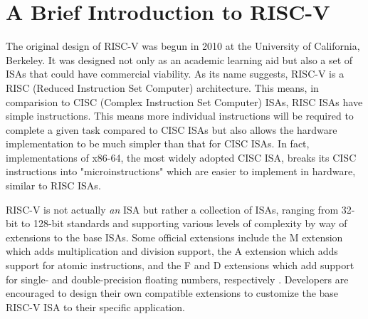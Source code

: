 \documentclass[lettersize,journal]{IEEEtran}
\begin{document}
\section{A Brief Introduction to RISC-V}
The original design of RISC-V was begun in 2010 at the University of California, Berkeley. 
It was designed not only as an academic learning aid but also a set of ISAs that could have commercial viability. 
As its name suggests, RISC-V is a RISC (Reduced Instruction Set Computer) architecture. 
This means, in comparision to CISC (Complex Instruction Set Computer) ISAs, RISC ISAs have simple instructions. 
This means more individual instructions will be required to complete a given task compared to CISC ISAs but also allows the 
hardware implementation to be much simpler than that for CISC ISAs. In fact, implementations of x86-64, the most widely adopted CISC ISA, 
breaks its CISC instructions into "microinstructions" which are easier to implement in hardware, similar to RISC ISAs.

RISC-V is not actually \textit{an} ISA but rather a collection of ISAs, 
ranging from 32-bit to 128-bit standards and supporting various levels of complexity by way of extensions to the base ISAs. 
Some official extensions include the M extension which adds multiplication and division support, 
the A extension which adds support for atomic instructions, and the F and D extensions which add support for single- and double-precision floating numbers, 
respectively \cite{riscvunprovisioned}. Developers are encouraged to design their own compatible extensions to customize the base RISC-V ISA to their specific application.
\end{document}
